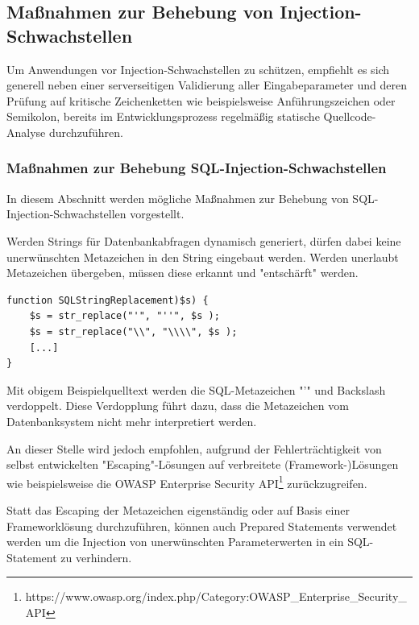 \subsection{Maßnahmen zur Behebung von Injection-Schwachstellen}

Um Anwendungen vor Injection-Schwachstellen zu schützen, empfiehlt es 
sich generell neben einer serverseitigen Validierung aller 
Eingabeparameter und deren Prüfung auf kritische Zeichenketten wie 
beispielsweise Anführungszeichen oder Semikolon, bereits im 
Entwicklungsprozess regelmäßig statische Quellcode-Analyse 
durchzuführen.

\subsubsection{Maßnahmen zur Behebung SQL-Injection-Schwachstellen}
In diesem Abschnitt werden mögliche Maßnahmen zur Behebung von 
SQL-Injection-Schwachstellen vorgestellt.

\label{escpace_metazeichen}

Werden Strings für Datenbankabfragen dynamisch generiert, dürfen dabei 
keine unerwünschten Metazeichen in den String eingebaut werden. Werden 
unerlaubt Metazeichen übergeben, müssen diese erkannt und "entschärft" 
werden.

\begin{lstlisting}[basicstyle=\ttfamily\footnotesize]
function SQLStringReplacement)$s) {
    $s = str_replace("'", "''", $s );
    $s = str_replace("\\", "\\\\", $s );
    [...]
}
\end{lstlisting}


Mit obigem Beispielquelltext werden die SQL-Metazeichen "'" und Backslash verdoppelt. Diese Verdopplung führt dazu, dass die Metazeichen vom Datenbanksystem nicht mehr interpretiert werden. 

An dieser Stelle wird jedoch empfohlen, aufgrund der Fehlerträchtigkeit von selbst entwickelten "Escaping"-Lösungen auf verbreitete (Framework-)Lösungen wie beispielsweise die OWASP Enterprise Security API\footnote{https://www.owasp.org/index.php/Category:OWASP\_Enterprise\_Security\_API} zurückzugreifen.


Statt das Escaping der Metazeichen eigenständig oder auf Basis einer Frameworklösung durchzuführen, können auch Prepared Statements verwendet werden um die Injection von unerwünschten Parameterwerten in ein SQL-Statement zu verhindern.

